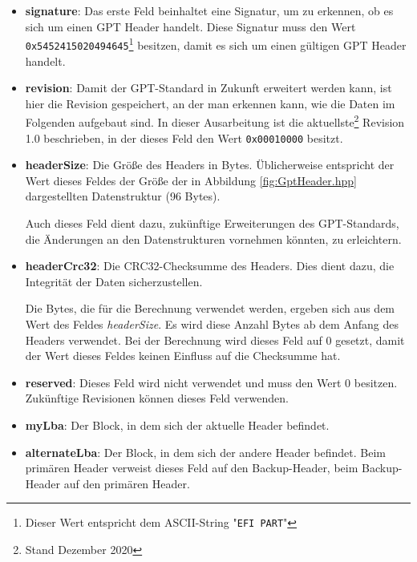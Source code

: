 \begin{itemize}
    \item \textbf{signature}: 
    Das erste Feld beinhaltet eine Signatur, um zu erkennen, ob es sich um einen GPT Header handelt.
    Diese Signatur muss den Wert \texttt{0x5452415020494645}\footnote{
        Dieser Wert entspricht dem ASCII-String "\texttt{EFI PART}"
    } 
    besitzen, damit es sich um einen gültigen GPT Header handelt.

    \item \textbf{revision}:
    Damit der GPT-Standard in Zukunft erweitert werden kann, ist hier die Revision gespeichert, an der man erkennen kann, wie die Daten im Folgenden aufgebaut sind.
    In dieser Ausarbeitung ist die aktuellste\footnote{
        Stand Dezember 2020
    }
    Revision 1.0 beschrieben, in der dieses Feld den Wert \texttt{0x00010000} besitzt.

    \item \textbf{headerSize}:
    Die Größe des Headers in Bytes.
    Üblicherweise entspricht der Wert dieses Feldes der Größe der in Abbildung \ref{fig:GptHeader.hpp} dargestellten Datenstruktur (96 Bytes).
    
    Auch dieses Feld dient dazu, zukünftige Erweiterungen des GPT-Standards, die Änderungen an den Datenstrukturen vornehmen könnten, zu erleichtern.

    \newpage
    \item \textbf{headerCrc32}:
    Die CRC32-Checksumme des Headers.
    Dies dient dazu, die Integrität der Daten sicherzustellen.

    Die Bytes, die für die Berechnung verwendet werden, ergeben sich aus dem Wert des Feldes \textit{headerSize}.
    Es wird diese Anzahl Bytes ab dem Anfang des Headers verwendet.
    Bei der Berechnung wird dieses Feld auf 0 gesetzt, damit der Wert dieses Feldes keinen Einfluss auf die Checksumme hat.
     

    \item \textbf{reserved}:
    Dieses Feld wird nicht verwendet und muss den Wert 0 besitzen. Zukünftige Revisionen können dieses Feld verwenden.

    \item \textbf{myLba}:
    Der Block, in dem sich der aktuelle Header befindet.

    \item \textbf{alternateLba}:
    Der Block, in dem sich der andere Header befindet.
    Beim primären Header verweist dieses Feld auf den Backup-Header, beim Backup-Header auf den primären Header.


\end{itemize}
